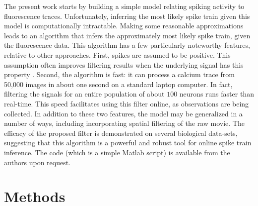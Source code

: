 The present work starts by building a simple model relating spiking activity to fluorescence traces. Unfortunately, inferring the most likely spike train given this model is computationally intractable.  Making some reasonable approximations leads to an algorithm that infers the approximately most likely spike train, given the fluorescence data.  This algorithm has a few particularly noteworthy features, relative to other approaches.  First, spikes are assumed to be positive.  This assumption often improves filtering results when the underlying signal has this property \cite{PortugalVicente94, MarkhamConchello99, LeeSeung99, LLS04, OGradyPearlmutter06, HuysPaninski06, Cunningham08, PaninskiWu09}.  Second, the algorithm is fast: it can process a calcium trace from 50,000 images in about one second on a standard laptop computer. In fact, filtering the signals for an entire population of about $100$ neurons runs faster than real-time. This speed facilitates using this filter online, as observations are being collected. In addition to these two features, the model may be generalized in a number of ways, including incorporating spatial filtering of the raw movie. The efficacy of the proposed filter is demonstrated on several biological data-sets, suggesting that this algorithm is a powerful and robust tool for online spike train inference.  The code (which is a simple Matlab script) is available from the authors upon request.







\section{Methods} \label{sec:methods}



